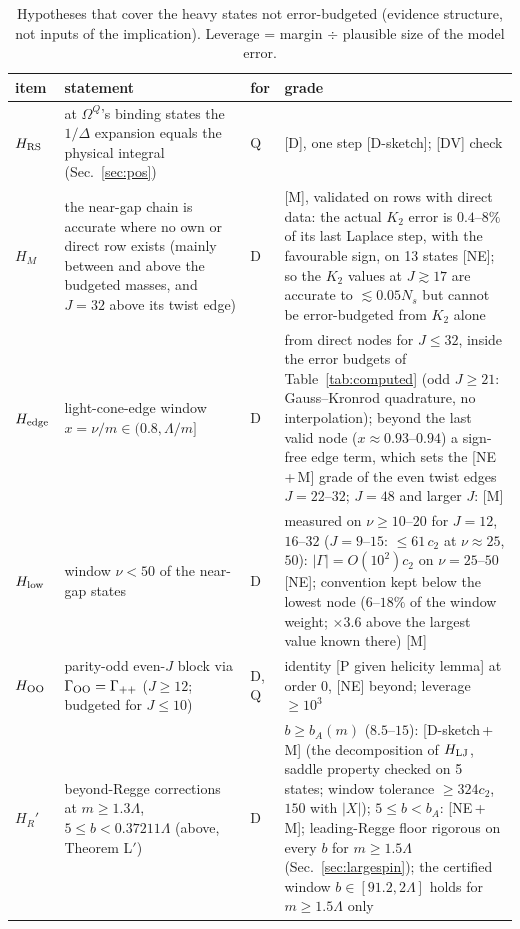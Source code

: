 \documentclass[aps,prl,onecolumn,superscriptaddress,nofootinbib]{revtex4-2}
\begin{document}
\begin{table}[!htbp]
\caption{\label{tab:cover}Hypotheses that cover the heavy states not error-budgeted (evidence structure,
not inputs of the implication). Leverage = margin $\div$ plausible size of the model error.}
\footnotesize
\begin{ruledtabular}
\begin{tabular}{L{1.9cm}L{9.6cm}L{0.8cm}L{4.0cm}}
item & statement & for & grade\\\hline
$H_{\rm RS}$ & at $\Omega^Q$'s binding states the $1/\Delta$ expansion equals the physical integral (Sec.~\ref{sec:pos}) & Q & [D], one step [D-sketch]; [DV] check\\
$H_M$ & the near-gap chain is accurate where no own or direct row exists (mainly between and above the budgeted masses, and $J=32$ above its twist edge)
& D & [M], validated on rows with direct data: the actual $K_2$ error is $0.4$--$8\%$ of its last Laplace step, with the favourable sign, on 13 states [NE]; so the $K_2$ values at $J\gtrsim17$ are accurate to $\lesssim0.05N_s$ but cannot be error-budgeted from $K_2$ alone\\
$H_{\rm edge}$ & light-cone-edge window $x=\nu/m\in(0.8,\Lambda/m]$ & D & from direct nodes for $J\le32$, inside the error budgets of Table~\ref{tab:computed} (odd $J\ge21$: Gauss--Kronrod quadrature, no interpolation); beyond the last valid node ($x\approx0.93$--$0.94$) a sign-free edge term, which sets the [NE\,+\,M] grade of the even twist edges $J=22$--$32$; $J=48$ and larger $J$: [M]\\
$H_{\rm low}$ & window $\nu<50$ of the near-gap states & D & measured on $\nu\ge10$--$20$ for $J=12$, $16$--$32$ ($J=9$--$15$: $\le61\,c_2$ at $\nu\approx25$, $50$): $|\Gamma|=O(10^2)c_2$ on $\nu=25$--$50$ [NE]; convention kept below the lowest node ($6$--$18\%$ of the window weight; $\times3.6$ above the largest value known there) [M]\\
$H_{\rm OO}$ & parity-odd even-$J$ block via $\Gamma_{\rm OO}=\Gamma_{++}$ ($J\ge12$; budgeted for $J\le10$) & D, Q & identity [P given helicity lemma] at order 0, [NE] beyond; leverage $\ge10^3$\\
$H_R'$ & beyond-Regge corrections at $m\ge1.3\Lambda$, $5\le b<0.37211\Lambda$ (above, Theorem L$'$) & D & $b\ge b_A(m)$ ($8.5$--$15$): [D-sketch\,+\,M] (the decomposition of $H_{\rm LJ}$, saddle property checked on 5 states; window tolerance $\ge324c_2$, $150$ with $|X|$); $5\le b<b_A$: [NE\,+\,M]; leading-Regge floor rigorous on every $b$ for $m\ge1.5\Lambda$ (Sec.~\ref{sec:largespin}); the certified window $b\in[91.2,2\Lambda]$ holds for $m\ge1.5\Lambda$ only\\

\end{tabular}
\end{ruledtabular}
\end{table}
\end{document}
